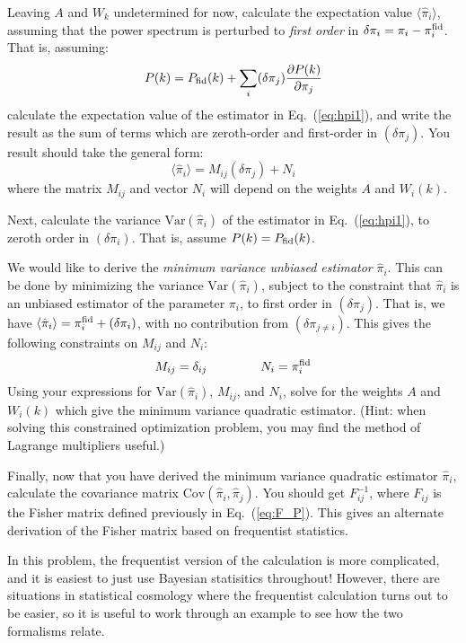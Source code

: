 \documentclass[aps,prd,superscriptaddress,groupedaddress,nofootinbib,nobibnotes]{revtex4}
\newcommand{\be}{\begin{equation}}
\newcommand{\ee}{\end{equation}}
\def\Var{\mbox{Var}}
\def\hpi{{\hat\pi}}
\begin{document}
\begin{enumerate}
  Leaving $A$ and $W_k$ undetermined for now, calculate the expectation value $\langle \hpi_i \rangle$, assuming that
  the power spectrum is perturbed to {\em first order} in $\delta\pi_i = \pi_i - \pi_i^{\rm fid}$.  That is, assuming:
\be
  P(k) = P_{\rm fid}(k) + \sum_i (\delta \pi_j) \frac{\partial P(k)}{\partial\pi_j}
\ee
  calculate the expectation value of the estimator in Eq.~(\ref{eq:hpi1}), and write the result as the sum of terms
  which are zeroth-order and first-order in $(\delta\pi_j)$.  You result should take the general form:
\be
  \langle \hpi_i \rangle = M_{ij} (\delta \pi_j) + N_i
\ee
  where the matrix $M_{ij}$ and vector $N_i$ will depend on the weights $A$ and $W_i(k)$.

  Next, calculate the variance $\Var(\hpi_i)$ of the estimator in Eq.~(\ref{eq:hpi1}), to zeroth order in $(\delta\pi_i)$.
  That is, assume $P(k) = P_{\rm fid}(k)$.

  We would like to derive the {\em minimum variance unbiased estimator} $\hpi_i$.
  This can be done by minimizing the variance $\Var(\hpi_i)$, subject to the constraint that $\hpi_i$ is an unbiased estimator
  of the parameter $\pi_i$, to first order in $(\delta\pi_j)$.
  That is, we have $\langle \hpi_i \rangle = \pi_i^{\rm fid} + (\delta\pi_i)$, with no contribution from $(\delta\pi_{j \ne i})$.
  This gives the following constraints on $M_{ij}$ and $N_i$:
\be
 M_{ij} = \delta_{ij}
   \hspace{1.5cm}
 N_i = \pi_i^{\rm fid}
\ee
  Using your expressions for $\Var(\hpi_i)$, $M_{ij}$, and $N_i$, solve for the weights $A$ and $W_i(k)$ which
  give the minimum variance quadratic estimator.  (Hint: when solving this constrained optimization problem, you
  may find the method of Lagrange multipliers useful.)

  Finally, now that you have derived the minimum variance quadratic estimator $\hpi_i$,
  calculate the covariance matrix $\mbox{Cov}(\hpi_i, \hpi_j)$.  You should get $F^{-1}_{ij}$,
  where $F_{ij}$ is the Fisher matrix defined previously in Eq.~(\ref{eq:F_P}).  This gives
  an alternate derivation of the Fisher matrix based on frequentist statistics.  

  In this problem, the frequentist version of the calculation is more complicated,
  and it is easiest to just use Bayesian statisitics throughout!  However, there are
  situations in statistical cosmology where the frequentist calculation turns out to be
  easier, so it is useful to work through an example to see how the two formalisms relate.
\end{enumerate}
\end{document}

